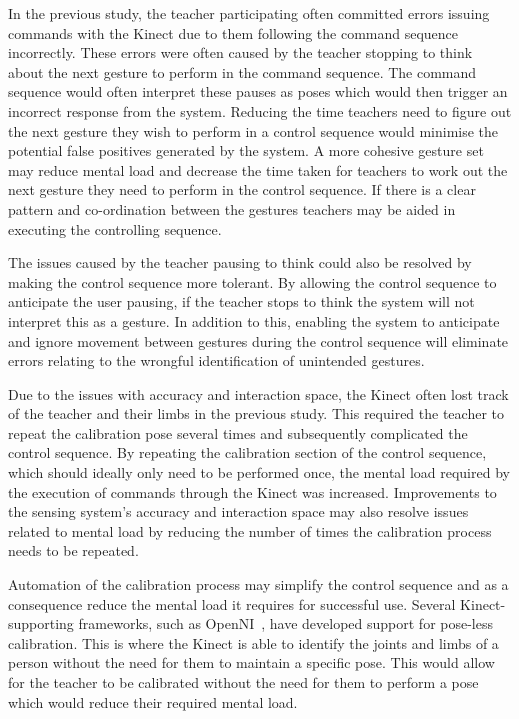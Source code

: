\documentclass[link]{IWCOMP}
\begin{document}
In the previous study, the teacher participating often committed errors issuing commands with the Kinect due to them following the command sequence incorrectly.
These errors were often caused by the teacher stopping to think about the next gesture to perform in the command sequence.
The command sequence would often interpret these pauses as poses which would then trigger an incorrect response from the system.
Reducing the time teachers need to figure out the next gesture they wish to perform in a control sequence would minimise the potential false positives generated by the system.
A more cohesive gesture set may reduce mental load and decrease the time taken for teachers to work out the next gesture they need to perform in the control sequence.
If there is a clear pattern and co-ordination between the gestures teachers may be aided in executing the controlling sequence.

The issues caused by the teacher pausing to think could also be resolved by making the control sequence more tolerant.
By allowing the control sequence to anticipate the user pausing, if the teacher stops to think the system will not interpret this as a gesture.
In addition to this, enabling the system to anticipate and ignore movement between gestures during the control sequence will eliminate errors relating to the wrongful identification of unintended gestures.

Due to the issues with accuracy and interaction space, the Kinect often lost track of the teacher and their limbs in the previous study.
This required the teacher to repeat the calibration pose several times and subsequently complicated the control sequence.
By repeating the calibration section of the control sequence, which should ideally only need to be performed once, the mental load required by the execution of commands through the Kinect was increased.
Improvements to the sensing system's accuracy and interaction space may also resolve issues related to mental load by reducing the number of times the calibration process needs to be repeated.

Automation of the calibration process may simplify the control sequence and as a consequence reduce the mental load it requires for successful use.
Several Kinect-supporting frameworks, such as OpenNI~\cite{Organisation2011}, have developed support for pose-less calibration.
This is where the Kinect is able to identify the joints and limbs of a person without the need for them to maintain a specific pose.
This would allow for the teacher to be calibrated without the need for them to perform a pose which would reduce their required mental load.
\end{document}
